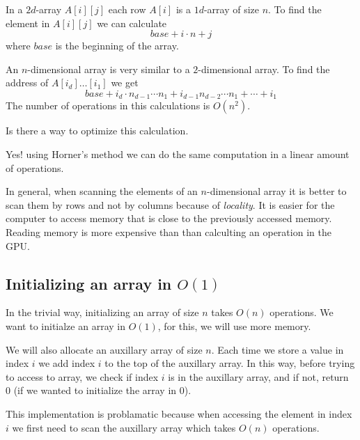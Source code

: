 \documentclass[11pt,a4paper]{article}
\begin{document}
\begin{example}[$2d$-array]
  In a $2d$-array $A[i][j]$ each row $A[i]$ is a $1d$-array of size $n$.
  To find the element in $A[i][j]$ we can calculate
  \[
    base + i \cdot n + j
  \]
  where $base$ is the beginning of the array.
\end{example}

\begin{example}
  An $n$-dimensional array is very similar to a $2$-dimensional array.
  To find the address of $A[i_d]\dots[i_1]$ we get
  \[
    base + i_d \cdot n_{d-1} \cdots n_1 + i_{d-1} n_{d-2} \cdots n_1 +
    \cdots + i_1
  \]
  The number of operations in this calculations is $O(n^2)$.
  \begin{question}
    Is there a way to optimize this calculation.
  \end{question}
  \begin{answer}
    Yes! using Horner's method we can do the same computation in a linear
    amount of operations.
  \end{answer}
\end{example}

\begin{remark}
  In general, when scanning the elements of an $n$-dimensional array
  it is better to scan them by rows and not by columns because of 
  \emph{locality}. It is easier for the computer to access memory that
  is close to the previously accessed memory.
  Reading memory is more expensive than than calculting an operation in the GPU.
\end{remark}

\subsection{Initializing an array in \texorpdfstring{$O(1)$}{O(1)}}
In the trivial way, initializing an array of size $n$ takes $O(n)$ operations.
We want to initialze an array in $O(1)$, for this, we will use more memory.

\begin{example}
  We will also allocate an auxillary array of size $n$.
  Each time we store a value in index $i$ we add index $i$ to the top
  of the auxillary array.
  In this way, before trying to access to array, we check if index $i$
  is in the auxillary array, and if not, return $0$ (if we wanted to initialize
  the array in $0$).

  This implementation is problamatic because when accessing the element
  in index $i$ we first need to scan the auxillary array which takes
  $O(n)$ operations.
\end{example}
\end{document}
